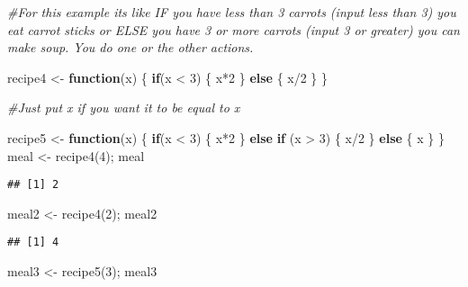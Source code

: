 \documentclass[
]{article}
\newenvironment{Shaded}{\begin{snugshade}}{\end{snugshade}}
\newcommand{\CommentTok}[1]{\textcolor[rgb]{0.56,0.35,0.01}{\textit{#1}}}
\newcommand{\ControlFlowTok}[1]{\textcolor[rgb]{0.13,0.29,0.53}{\textbf{#1}}}
\newcommand{\DecValTok}[1]{\textcolor[rgb]{0.00,0.00,0.81}{#1}}
\newcommand{\FunctionTok}[1]{\textcolor[rgb]{0.00,0.00,0.00}{#1}}
\newcommand{\NormalTok}[1]{#1}
\newcommand{\OtherTok}[1]{\textcolor[rgb]{0.56,0.35,0.01}{#1}}
\newcommand{\SpecialCharTok}[1]{\textcolor[rgb]{0.00,0.00,0.00}{#1}}
\begin{document}
\begin{Shaded}
\begin{Highlighting}[]
\CommentTok{\#For this example it\textquotesingle{}s like IF you have less than 3 carrots (input less than 3) you eat carrot sticks or ELSE you have 3 or more carrots (input 3 or greater) you can make soup. You do one or the other actions. }

\NormalTok{recipe4 }\OtherTok{\textless{}{-}} \ControlFlowTok{function}\NormalTok{(x) \{}
  \ControlFlowTok{if}\NormalTok{(x }\SpecialCharTok{\textless{}} \DecValTok{3}\NormalTok{) \{}
\NormalTok{    x}\SpecialCharTok{*}\DecValTok{2}
\NormalTok{  \} }
  \ControlFlowTok{else}\NormalTok{ \{}
\NormalTok{    x}\SpecialCharTok{/}\DecValTok{2}
\NormalTok{  \}}
\NormalTok{\}}

\CommentTok{\#Just put x if you want it to be equal to x}

\NormalTok{recipe5 }\OtherTok{\textless{}{-}} \ControlFlowTok{function}\NormalTok{(x) \{}
  \ControlFlowTok{if}\NormalTok{(x }\SpecialCharTok{\textless{}} \DecValTok{3}\NormalTok{) \{}
\NormalTok{    x}\SpecialCharTok{*}\DecValTok{2}
\NormalTok{  \} }
  \ControlFlowTok{else} \ControlFlowTok{if}\NormalTok{ (x }\SpecialCharTok{\textgreater{}} \DecValTok{3}\NormalTok{) \{}
\NormalTok{    x}\SpecialCharTok{/}\DecValTok{2}
\NormalTok{  \}}
  \ControlFlowTok{else}\NormalTok{ \{}
\NormalTok{    x}
\NormalTok{  \}}
\NormalTok{\}}
\NormalTok{meal }\OtherTok{\textless{}{-}} \FunctionTok{recipe4}\NormalTok{(}\DecValTok{4}\NormalTok{); meal}
\end{Highlighting}
\end{Shaded}

\begin{verbatim}
## [1] 2
\end{verbatim}

\begin{Shaded}
\begin{Highlighting}[]
\NormalTok{meal2 }\OtherTok{\textless{}{-}} \FunctionTok{recipe4}\NormalTok{(}\DecValTok{2}\NormalTok{); meal2}
\end{Highlighting}
\end{Shaded}

\begin{verbatim}
## [1] 4
\end{verbatim}

\begin{Shaded}
\begin{Highlighting}[]
\NormalTok{meal3 }\OtherTok{\textless{}{-}} \FunctionTok{recipe5}\NormalTok{(}\DecValTok{3}\NormalTok{); meal3}
\end{Highlighting}
\end{Shaded}
\end{document}

